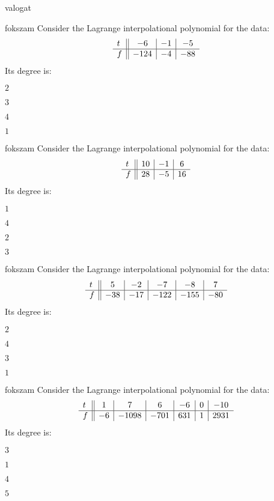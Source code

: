 \documentclass[12pt]{article}
\begin{document}
\begin{quiz}{valogat}
\begin{multi}{fokszam}
Consider the Lagrange interpolational polynomial for the data:
$$\begin{array}{l ||c|c|c}t&-6&-1&-5\\ \hline f&-124&-4&-88 \\ \end{array}$$
Its degree is:
\item* $ 2 $
\item  $ 3 $
\item  $ 4 $
\item  $ 1 $
\end{multi}
\begin{multi}{fokszam}
Consider the Lagrange interpolational polynomial for the data:
$$\begin{array}{l ||c|c|c}t&10&-1&6\\ \hline f&28&-5&16 \\ \end{array}$$
Its degree is:
\item* $ 1 $
\item  $ 4 $
\item  $ 2 $
\item  $ 3 $
\end{multi}
\begin{multi}{fokszam}
Consider the Lagrange interpolational polynomial for the data:
$$\begin{array}{l ||c|c|c|c|c}t&5&-2&-7&-8&7\\ \hline f&-38&-17&-122&-155&-80 \\ \end{array}$$
Its degree is:
\item* $ 2 $
\item  $ 4 $
\item  $ 3 $
\item  $ 1 $
\end{multi}
\begin{multi}{fokszam}
Consider the Lagrange interpolational polynomial for the data:
$$\begin{array}{l ||c|c|c|c|c|c}t&1&7&6&-6&0&-10\\ \hline f&-6&-1098&-701&631&1&2931 \\ \end{array}$$
Its degree is:
\item* $ 3 $
\item  $ 1 $
\item  $ 4 $
\item  $ 5 $

\end{multi}
\end{quiz}
\end{document}
